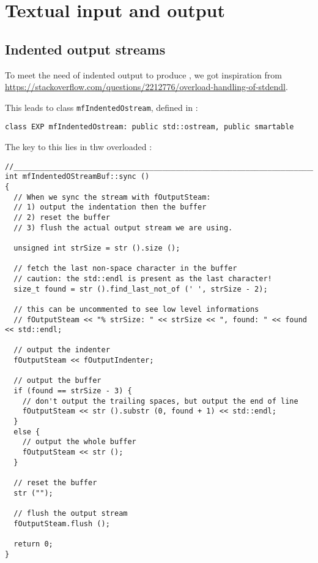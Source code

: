 
\chapter{Textual input and output}



\section{Indented output streams}

To meet the need of indented output to produce , we got inspiration from \url{https://stackoverflow.com/questions/2212776/overload-handling-of-stdendl}.

This leads to class   {\tt mfIndentedOstream}, defined in :
\begin{lstlisting}[language=CPlusPlus]
class EXP mfIndentedOstream: public std::ostream, public smartable
\end{lstlisting}

The key to this lies in thw overloaded :
\begin{lstlisting}[language=CPlusPlus]
//______________________________________________________________________________
int mfIndentedOStreamBuf::sync ()
{
  // When we sync the stream with fOutputSteam:
  // 1) output the indentation then the buffer
  // 2) reset the buffer
  // 3) flush the actual output stream we are using.

  unsigned int strSize = str ().size ();

  // fetch the last non-space character in the buffer
  // caution: the std::endl is present as the last character!
  size_t found = str ().find_last_not_of (' ', strSize - 2);

  // this can be uncommented to see low level informations
  // fOutputSteam << "% strSize: " << strSize << ", found: " << found << std::endl;

  // output the indenter
  fOutputSteam << fOutputIndenter;

  // output the buffer
  if (found == strSize - 3) {
    // don't output the trailing spaces, but output the end of line
    fOutputSteam << str ().substr (0, found + 1) << std::endl;
  }
  else {
    // output the whole buffer
    fOutputSteam << str ();
  }

  // reset the buffer
  str ("");

  // flush the output stream
  fOutputSteam.flush ();

  return 0;
}
\end{lstlisting}

